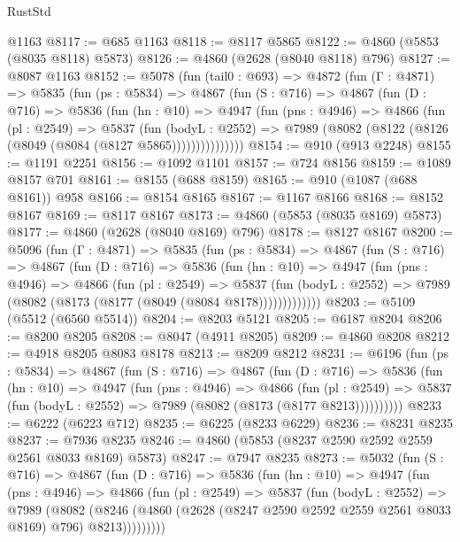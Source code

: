 \begin{lexlean}{RustStd}
\begin{coremodule}
    @1163
@8117 := @685 @1163
@8118 := @8117 @5865
@8122 := @4860 (@5853 (@8035 @8118) @5873)
@8126 := @4860 (@2628 (@8040 @8118) @796)
@8127 := @8087 @1163
@8152 := @5078
    (fun (tail0 : @693) =>
    @4872
      (fun (Γ : @4871) =>
      @5835
        (fun (ps : @5834) =>
        @4867
          (fun (S : @716) =>
          @4867
            (fun (D : @716) =>
            @5836
              (fun (hn : @10) =>
              @4947
                (fun (pns : @4946) =>
                @4866
                  (fun (pl : @2549) =>
                  @5837
                    (fun (bodyL : @2552) =>
                    @7989 (@8082 (@8122 (@8126 (@8049 (@8084 (@8127 @5865)))))))))))))))
@8154 := @910 (@913 @2248)
@8155 := @1191 @2251
@8156 := @1092 @1101
@8157 := @724 @8156
@8159 := @1089 @8157 @701
@8161 := @8155 (@688 @8159)
@8165 := @910 (@1087 (@688 @8161)) @958
@8166 := @8154 @8165
@8167 := @1167 @8166
@8168 := @8152 @8167
@8169 := @8117 @8167
@8173 := @4860 (@5853 (@8035 @8169) @5873)
@8177 := @4860 (@2628 (@8040 @8169) @796)
@8178 := @8127 @8167
@8200 := @5096
    (fun (Γ : @4871) =>
    @5835
      (fun (ps : @5834) =>
      @4867
        (fun (S : @716) =>
        @4867
          (fun (D : @716) =>
          @5836
            (fun (hn : @10) =>
            @4947
              (fun (pns : @4946) =>
              @4866
                (fun (pl : @2549) =>
                @5837
                  (fun (bodyL : @2552) =>
                  @7989 (@8082 (@8173 (@8177 (@8049 (@8084 @8178)))))))))))))
@8203 := @5109 (@5512 (@6560 @5514))
@8204 := @8203 @5121
@8205 := @6187 @8204
@8206 := @8200 @8205
@8208 := @8047 (@4911 @8205)
@8209 := @4860 @8208
@8212 := @4918 @8205 @8083 @8178
@8213 := @8209 @8212
@8231 := @6196
    (fun (ps : @5834) =>
    @4867
      (fun (S : @716) =>
      @4867
        (fun (D : @716) =>
        @5836
          (fun (hn : @10) =>
          @4947
            (fun (pns : @4946) =>
            @4866
              (fun (pl : @2549) =>
              @5837 (fun (bodyL : @2552) => @7989 (@8082 (@8173 (@8177 @8213))))))))))
@8233 := @6222 (@6223 @712)
@8235 := @6225 (@8233 @6229)
@8236 := @8231 @8235
@8237 := @7936 @8235
@8246 := @4860 (@5853 (@8237 @2590 @2592 @2559 @2561 @8033 @8169) @5873)
@8247 := @7947 @8235
@8273 := @5032
    (fun (S : @716) =>
    @4867
      (fun (D : @716) =>
      @5836
        (fun (hn : @10) =>
        @4947
          (fun (pns : @4946) =>
          @4866
            (fun (pl : @2549) =>
            @5837
              (fun (bodyL : @2552) =>
              @7989
                (@8082
                  (@8246
                    (@4860 (@2628 (@8247 @2590 @2592 @2559 @2561 @8033 @8169) @796) @8213)))))))))

\end{coremodule}
\end{lexlean}
